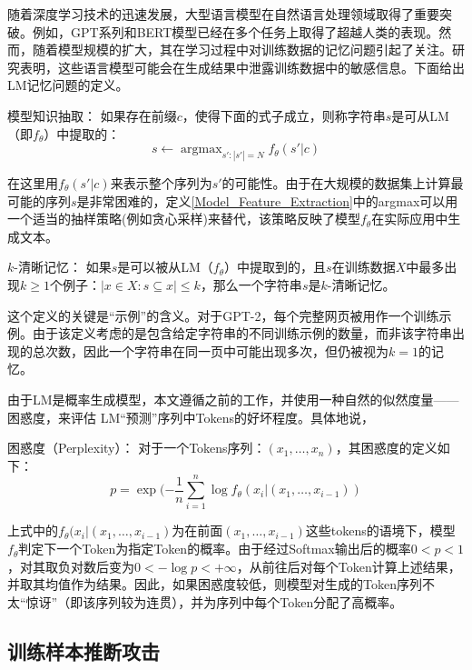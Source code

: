 随着深度学习技术的迅速发展，大型语言模型在自然语言处理领域取得了重要突破。例如，GPT系列\cite{GPT2, GPT3}和BERT\cite{BERT}模型已经在多个任务上取得了超越人类的表现。然而，随着模型规模的扩大，其在学习过程中对训练数据的记忆问题引起了关注。研究表明\cite{Extrac_Train_Data_From_LM}，这些语言模型可能会在生成结果中泄露训练数据中的敏感信息。下面给出LM记忆问题的定义。

\begin{definition}{模型知识抽取：}
	如果存在前缀$c$，使得下面的式子成立，则称字符串$s$是可从LM（即$f_\theta$）中提取的：
	$$s\leftarrow \mathop{argmax}_{s':|s'|=N} f_\theta(s'|c)$$
	\label{Model_Feature_Extraction}
\end{definition}

在这里用$f_\theta (s'|c)$来表示整个序列为$s'$的可能性。由于在大规模的数据集上计算最可能的序列$s$是非常困难的，定义\ref{Model_Feature_Extraction}中的argmax可以用一个适当的抽样策略(例如贪心采样)来替代，该策略反映了模型$f_\theta$在实际应用中生成文本。

\begin{definition}{$k$-清晰记忆：}
	\label{k_clear_mem}
	如果$s$是可以被从LM（$f_\theta$）中提取到的，且$s$在训练数据$X$中最多出现$k\geq1$个例子：$|{x\in X: s\subseteq x}|\leq k$，那么一个字符串$s$是$k$-清晰记忆。
\end{definition}

这个定义的关键是“示例”的含义。对于GPT-2，每个完整网页被用作一个训练示例。由于该定义考虑的是包含给定字符串的不同训练示例的数量，而非该字符串出现的总次数，因此一个字符串在同一页中可能出现多次，但仍被视为$k=1$的记忆。

由于LM是概率生成模型，本文遵循之前的工作，并使用一种自然的似然度量——困惑度，来评估 LM“预测”序列中Tokens的好坏程度。具体地说，

\begin{definition}{困惑度（Perplexity）：}
	对于一个Tokens序列：$(x_1,\dots,x_n )$，其困惑度的定义如下：
	$$p=\exp(-\frac{1}{n}\sum_{i=1}^{n}\log f_\theta(x_i|(x_1,\dots,x_{i-1}))$$
	\label{PPL}
\end{definition}

上式中的$f_\theta(x_i|(x_1,\dots,x_{i-1})$为在前面$(x_1,\dots,x_{i-1})$这些tokens的语境下，模型$f_\theta$判定下一个Token为指定Token的概率。由于经过\rm{Softmax}输出后的概率$0<p<1$，对其取负对数后变为$0 < -\log p < +\infty$，从前往后对每个Token计算上述结果，并取其均值作为结果。因此，如果困惑度较低，则模型对生成的Token序列不太“惊讶”（即该序列较为连贯），并为序列中每个Token分配了高概率。


\subsection{训练样本推断攻击} \label{训练样本推断攻击-实验设置}

